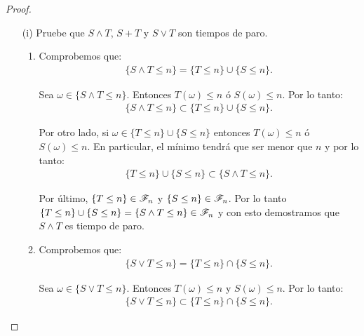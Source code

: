 \begin{proof}
\begin{enumerate}
                \item[(i)] 
                	Pruebe que $ S \wedge T $, $ S + T $ y $ S \vee T$ son tiempos de paro.\\
                
                	\begin{enumerate}
                		\item 
                			Comprobemos que:
                			\begin{align}
                				\{ S \wedge T \leq n \} = \{ T \leq n \} \cup \{ S \leq n\}.
                			\end{align}
                			
							Sea $\omega \in \{ S \wedge T \leq n \}$. Entonces $T(\omega) \leq n$ ó $S(\omega) \leq n$.
							Por lo tanto:
							\begin{align}
		                			\{ S \wedge T \leq n \} \subset \{ T \leq n \} \cup \{ S \leq n\}.							
							\end{align}
							
							Por otro lado, si $\omega \in \{ T \leq n \} \cup \{ S \leq n\}$ entonces $T(\omega) \leq n$ ó $S(\omega) \leq n$.
							En particular, el mínimo tendrá que ser menor que $n$ y por lo tanto:
							\begin{align}
		                			\{ T \leq n \} \cup \{ S \leq n\} \subset \{ S \wedge T \leq n \}.						
							\end{align}
							
							Por último, $\{ T \leq n \} \in \mathscr{F}_n$ y $\{ S \leq n \} \in \mathscr{F}_n$. Por lo tanto	\\	
							$\{ T \leq n \} \cup \{ S \leq n\} = \{ S \wedge T \leq n \} \in \mathscr{F}_n$ y con esto demostramos que 
							$ S \wedge T$ es tiempo de paro.\\
							
						\item
							Comprobemos que:
                			\begin{align}
                				\{ S \vee T \leq n \} = \{ T \leq n \} \cap \{ S \leq n\}.
                			\end{align}
                			
							Sea $\omega \in \{ S \vee T \leq n \}$. Entonces $T(\omega) \leq n$ y $S(\omega) \leq n$.
							Por lo tanto:
							\begin{align}
		                			\{ S \vee T \leq n \} \subset \{ T \leq n \} \cap \{ S \leq n\}.							
							\end{align}
							

\end{enumerate}
\end{enumerate}
\end{proof}
